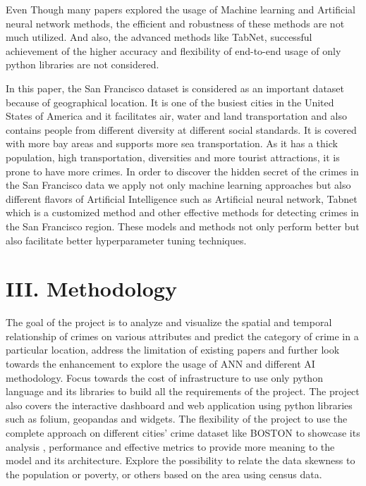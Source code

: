 \documentclass[conference,final,]{IEEEtran}
\begin{document}
Even Though many papers explored the usage of Machine learning and
Artificial neural network methods, the efficient and robustness of these
methods are not much utilized. And also, the advanced methods like
TabNet, successful achievement of the higher accuracy and flexibility of
end-to-end usage of only python libraries are not considered.

In this paper, the San Francisco dataset is considered as an important
dataset because of geographical location. It is one of the busiest
cities in the United States of America and it facilitates air, water and
land transportation and also contains people from different diversity at
different social standards. It is covered with more bay areas and
supports more sea transportation. As it has a thick population, high
transportation, diversities and more tourist attractions, it is prone to
have more crimes. In order to discover the hidden secret of the crimes
in the San Francisco data we apply not only machine learning approaches
but also different flavors of Artificial Intelligence such as Artificial
neural network, Tabnet which is a customized method and other effective
methods for detecting crimes in the San Francisco region. These models
and methods not only perform better but also facilitate better
hyperparameter tuning techniques.

\section{III. Methodology}\label{iii.-methodology}

The goal of the project is to analyze and visualize the spatial and
temporal relationship of crimes on various attributes and predict the
category of crime in a particular location, address the limitation of
existing papers and further look towards the enhancement to explore the
usage of ANN and different AI methodology. Focus towards the cost of
infrastructure to use only python language and its libraries to build
all the requirements of the project. The project also covers the
interactive dashboard and web application using python libraries such as
folium, geopandas and widgets. The flexibility of the project to use the
complete approach on different cities' crime dataset like BOSTON to
showcase its analysis , performance and effective metrics to provide
more meaning to the model and its architecture. Explore the possibility
to relate the data skewness to the population or poverty, or others
based on the area using census data.
\end{document}
